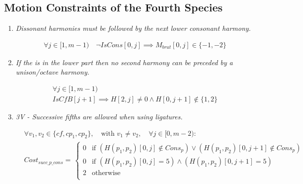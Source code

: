 \subsection*{Motion Constraints of the Fourth Species}
\begin{enumerate}[wide, label=\bfseries 4.P\arabic*]
  \item\label{rule:dissolved} {\textit{Dissonant harmonies must be followed by the next lower consonant harmony.}}

\begin{equation}
    \begin{gathered}
        \forall j \in [1, m-1) \quad
        \lnot IsCons[0, j] \implies M_{brut}[0, j] \in \{-1, -2\}
    \end{gathered}
\end{equation}

\item\label{rule:nosecond} {\textit{If the \cfs is in the lower part then no second harmony can be preceded by a unison/octave harmony.}}

\begin{equation}
    \begin{gathered}
        \forall j \in [1, m-1)\\
        \mathit{IsCfB}[j+1] \implies H[2, j] \neq 0 \land H[0, j+1] \notin \{1, 2\}
    \end{gathered}
\end{equation}

\item \textit{3V - Successive fifths are allowed when using ligatures.}    

    \begin{equation} \begin{aligned}
        &\forall v_1, v_2 \in \{\mathit{cf}, cp_1, cp_2\}, \quad \text{with } v_1 \neq v_2, \quad \forall j \in [0, m-2) \colon\\
        &Cost_{succ\_p\_cons} = \,  
        \begin{cases}
            0 & \text{if } (H(p_1, p_2)[0, j] \notin Cons_p) \lor (H(p_1, p_2)[0, j+1] \notin Cons_p)\\
            0 & \text{if } (H(p_1, p_2)[0, j] = 5 ) \land (H(p_1, p_2)[0, j+1] = 5) \\
            2 & \text{otherwise } \\
        \end{cases}\\
    \end{aligned} \end{equation}



\end{enumerate}
